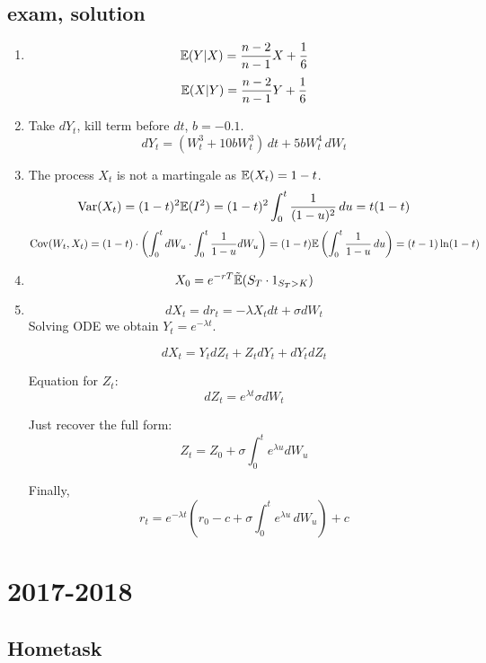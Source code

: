 \documentclass[12pt, a4paper]{article}
\begin{document}
\subsection{exam, solution}

\begin{enumerate}
\item
\[
\mathbb{E}(Y|X) = \frac{n-2}{n-1}X + \frac{1}{6}
\]
\[
\mathbb{E}(X|Y) = \frac{n-2}{n-1}Y + \frac{1}{6}
\]
\item Take $dY_t$, kill term before $dt$, $b=-0.1$.
\[
dY_t = (W_t^3 + 10bW_t^3) \, dt + 5bW_t^4 \, dW_t
\]
\item The process $X_t$ is not a martingale as $\mathbb{E}(X_t)=1-t$.
\[
\operatorname{Var}(X_t) = (1-t)^2\mathbb{E}(I^2) = (1-t)^2 \int_0^t \frac{1}{(1-u)^2} \, du = t(1-t)
\]
\[
\operatorname{Cov}(W_t, X_t) = (1-t) \cdot \left( \int_0^t dW_u \cdot \int_0^t \frac{1}{1-u}dW_u  \right) = (1-t) \mathbb{E}\left( \int_0^t \frac{1}{1-u} \, du \right) = (t-1)\ln(1-t)
\]
\item
\[
X_0 = e^{-rT}\tilde{\mathbb{E}}(S_T \cdot 1_{S_T>K})
\]
\item
\[
dX_t = dr_t = -\lambda X_t dt + \sigma dW_t
\]
Solving ODE we obtain $Y_t = e^{-\lambda t}$.

\[
dX_t = Y_t dZ_t + Z_t dY_t + dY_t dZ_t
\]

Equation for $Z_t$:
\[
dZ_t = e^{\lambda t}\sigma dW_t
\]

Just recover the full form:
\[
Z_t = Z_0 + \sigma \int_0^t e^{\lambda u} dW_u
\]

Finally,
\[
r_t = e^{-\lambda t}\left(r_0 - c + \sigma \int_0^t e^{\lambda u} \, dW_u  \right) + c
\]

\end{enumerate}






\section{2017-2018}

\subsection{Hometask}
\end{document}
